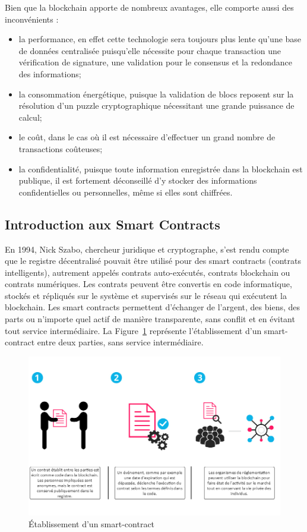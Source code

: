 \documentclass{tnreport}
\begin{document}
Bien que la blockchain apporte de nombreux avantages, elle comporte aussi des inconvénients :
\begin{itemize}
	\item la performance, en effet cette technologie sera toujours plus lente qu'une base de données centralisée puisqu'elle nécessite pour chaque transaction une vérification de signature, une validation pour le consensus et la redondance des informations; 
	\item la consommation énergétique, puisque la validation de blocs reposent sur la résolution d'un puzzle cryptographique nécessitant une grande puissance de calcul; 
	\item le coût, dans le cas où il est nécessaire d'effectuer un grand nombre de transactions coûteuses;
	\item la confidentialité, puisque toute information enregistrée dans la blockchain est publique, il est fortement déconseillé d'y stocker des informations confidentielles ou personnelles, même si elles sont chiffrées.
\end{itemize}

\subsection{Introduction aux Smart Contracts}

En 1994, Nick Szabo, chercheur juridique et cryptographe, s'est rendu compte que le registre décentralisé pouvait être utilisé pour des smart contracts (contrats intelligents), autrement appelés contrats auto-exécutés, contrats blockchain ou contrats numériques.
Les contrats peuvent être convertis en code informatique, stockés et répliqués sur le système et supervisés sur le réseau qui exécutent la blockchain.
Les smart contracts permettent d'échanger de l'argent, des biens, des parts ou n'importe quel  actif de manière transparente, sans conflit et en évitant tout service intermédiaire.
La Figure~\ref{fig:smart-contracts} représente l'établissement d'un smart-contract entre deux parties, sans service intermédiaire.

\begin{figure}[h]
	\centering
	\includegraphics[scale=0.53]{figures/smart-contracts}
	\caption{Établissement d'un smart-contract \cite{smart-contracts}}
	\label{fig:smart-contracts}
\end{figure}
\end{document}
